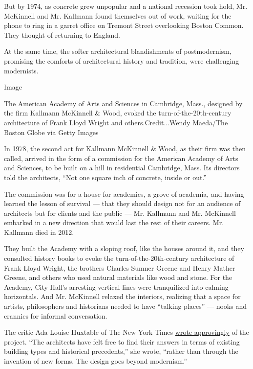 But by 1974, as concrete grew unpopular and a national recession took
hold, Mr. McKinnell and Mr. Kallmann found themselves out of work,
waiting for the phone to ring in a garret office on Tremont Street
overlooking Boston Common. They thought of returning to England.

At the same time, the softer architectural blandishments of
postmodernism, promising the comforts of architectural history and
tradition, were challenging modernists.

Image

The American Academy of Arts and Sciences in Cambridge, Mass., designed
by the firm Kallmann McKinnell \& Wood, evoked the
turn-of-the-20th-century architecture of Frank Lloyd Wright and
others.Credit...Wendy Maeda/The Boston Globe via Getty Images

In 1978, the second act for Kallmann McKinnell \& Wood, as their firm
was then called, arrived in the form of a commission for the American
Academy of Arts and Sciences, to be built on a hill in residential
Cambridge, Mass. Its directors told the architects, ``Not one square
inch of concrete, inside or out.''

The commission was for a house for academics, a grove of academia, and
having learned the lesson of survival --- that they should design not
for an audience of architects but for clients and the public --- Mr.
Kallmann and Mr. McKinnell embarked in a new direction that would last
the rest of their careers. Mr. Kallmann died in 2012.

They built the Academy with a sloping roof, like the houses around it,
and they consulted history books to evoke the turn-of-the-20th-century
architecture of Frank Lloyd Wright, the brothers Charles Sumner Greene
and Henry Mather Greene, and others who used natural materials like wood
and stone. For the Academy, City Hall's arresting vertical lines were
tranquilized into calming horizontals. And Mr. McKinnell relaxed the
interiors, realizing that a space for artists, philosophers and
historians needed to have ``talking places'' --- nooks and crannies for
informal conversation.

The critic Ada Louise Huxtable of The New York Times
\href{https://www.nytimes3xbfgragh.onion/1981/09/20/arts/architecture-view-classical-clarity-in-an-academic-design-cambridge-mass.html}{wrote
approvingly} of the project. ``The architects have felt free to find
their answers in terms of existing building types and historical
precedents,'' she wrote, ``rather than through the invention of new
forms. The design goes beyond modernism.''

